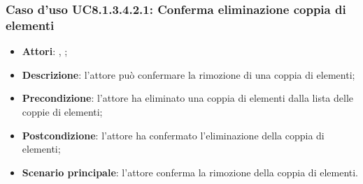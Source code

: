 		\subsubsection{Caso d'uso UC8.1.3.4.2.1: Conferma eliminazione coppia di elementi}
		\label{UC8.1.3.4.2.1}
		\begin{itemize}
			\item \textbf{Attori}: \uau, \uaupro;
			\item \textbf{Descrizione}: l'attore può confermare la rimozione di una coppia di elementi;
			\item \textbf{Precondizione}: l'attore ha eliminato una coppia di elementi dalla lista delle coppie di elementi;
			\item \textbf{Postcondizione}: l'attore ha confermato l'eliminazione della coppia di elementi;
			\item \textbf{Scenario principale}: l'attore conferma la rimozione della coppia di elementi.
		\end{itemize}


